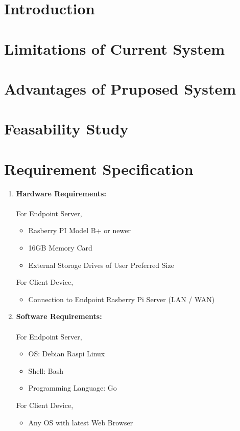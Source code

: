 \documentclass[12pt]{article}
\begin{document}
\section{Introduction}


\section{Limitations of Current System}


\section{Advantages of Pruposed System}


\section{Feasability Study}


\section{Requirement Specification}
\vspace{2cm}
\begin{enumerate}
	\item \textbf{Hardware Requirements:} \\ \\
		For Endpoint Server,
		\begin{itemize}
			\item Rasberry PI Model B+ or newer
			\item 16GB Memory Card
			\item External Storage Drives of User Preferred Size
		\end{itemize}
		For Client Device,
		\begin{itemize}
			\item Connection to Endpoint Rasberry Pi Server (LAN / WAN)
		\end{itemize}

	\vspace{1cm}
	\item \textbf{Software Requirements:} \\ \\
		For Endpoint Server,
		\begin{itemize}
				\item OS: Debian Raspi Linux
				\item Shell: Bash
				\item Programming Language: Go
		\end{itemize}
		For Client Device,
		\begin{itemize}
			\item Any OS with latest Web Browser
		\end{itemize}
\end{enumerate}
\end{document}
